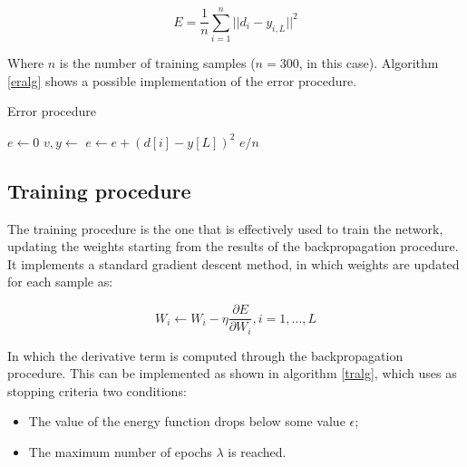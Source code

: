 \documentclass[letterpaper,headings=standardclasses]{scrartcl}
\begin{document}
$$ E = \frac{1}{n} \sum_{i = 1}^{n} || d_i - y_{i,L} ||^2 $$

Where $n$ is the number of training samples ($n = 300$, in this case). Algorithm \ref{eralg} shows a possible implementation of the error procedure.

\begin{algorithm}[h]
    \caption{Error procedure}
    \label{eralg}
    \begin{algorithmic}
    
        \State $e \gets 0$
            \State $v, y \gets $ 
            \State $e \gets e + (d[i] - y[L])^2$
        \EndFor
        \State \Return $e / n$
    \EndFunction
    
    \end{algorithmic}
\end{algorithm}

\subsection{Training procedure}

The training procedure is the one that is effectively used to train the network, updating the weights starting from the results of the backpropagation procedure. It implements a standard gradient descent method, in which weights are updated for each sample as:

$$ W_i \leftarrow W_i - \eta \frac{\partial E}{\partial W_i}, i = 1, \dots, L $$

In which the derivative term is computed through the backpropagation procedure. This can be implemented as shown in algorithm \ref{tralg}, which uses as stopping criteria two conditions:

\begin{itemize}
    \item The value of the energy function drops below some value $\epsilon$;
    \item The maximum number of epochs $\lambda$ is reached.
\end{itemize}
\end{document}
